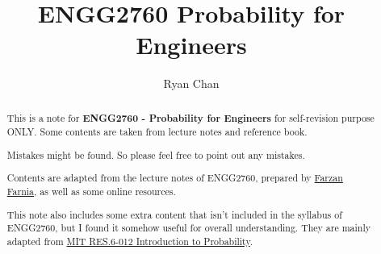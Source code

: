 \documentclass[a4paper]{report}
\author{Ryan Chan}
\title{ENGG2760 Probability for Engineers}
\begin{document}
\setlength\parindent{0pt}


\maketitle

\newpage

\begin{abstract}
	This is a note for \textbf{ENGG2760 - Probability for Engineers} for self-revision purpose ONLY. Some contents are taken from lecture notes and reference book. 
	
	Mistakes might be found. So please feel free to point out any mistakes.

	Contents are adapted from the lecture notes of ENGG2760, prepared by \href{https://www.cse.cuhk.edu.hk/~farnia/}{Farzan Farnia}, as well as some online resources.

	This note also includes some extra content that isn't included in the syllabus of ENGG2760, but I found it somehow useful for overall understanding. They are mainly adapted from \href{https://ocw.mit.edu/RES-6-012S18}{MIT RES.6-012 Introduction to Probability}.
\end{abstract}

\newpage

\tableofcontents

\setlength{\parskip}{5pt}
\appendix

\end{document}
